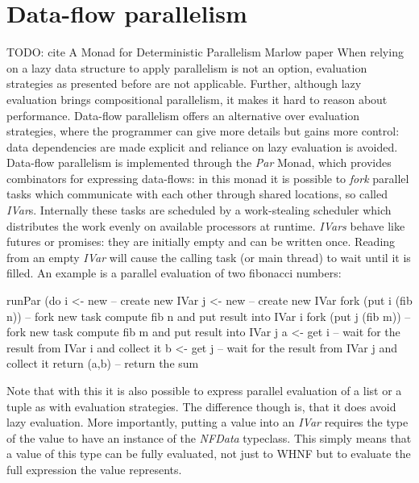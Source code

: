 \section{Data-flow parallelism}
TODO: cite A Monad for Deterministic Parallelism Marlow paper
When relying on a lazy data structure to apply parallelism is not an option, evaluation strategies as presented before are not applicable. Further, although lazy evaluation brings compositional parallelism, it makes it hard to reason about performance. Data-flow parallelism offers an alternative over evaluation strategies, where the programmer can give more details but gains more control: data dependencies are made explicit and reliance on lazy evaluation is avoided.
Data-flow parallelism is implemented through the \textit{Par} Monad, which provides combinators for expressing data-flows: in this monad it is possible to \textit{fork} parallel tasks which communicate with each other through shared locations, so called \textit{IVar}s. Internally these tasks are scheduled by a work-stealing scheduler which distributes the work evenly on available processors at runtime. \textit{IVars} behave like futures or promises: they are initially empty and can be written once. Reading from an empty \textit{IVar} will cause the calling task (or main thread) to wait until it is filled. An example is a parallel evaluation of two fibonacci numbers:

\begin{HaskellCode}
runPar (do
  i <- new             -- create new IVar
  j <- new             -- create new IVar
  fork (put i (fib n)) -- fork new task compute fib n and put result into IVar i
  fork (put j (fib m)) -- fork new task compute fib m and put result into IVar j
  a <- get i           -- wait for the result from IVar i and collect it
  b <- get j           -- wait for the result from IVar j and collect it
  return (a,b)         -- return the sum
\end{HaskellCode}

Note that with this it is also possible to express parallel evaluation of a list or a tuple as with evaluation strategies. The difference though is, that it does avoid lazy evaluation. More importantly, putting a value into an \textit{IVar} requires the type of the value to have an instance of the \textit{NFData} typeclass. This simply means that a value of this type can be fully evaluated, not just to WHNF but to evaluate the full expression the value represents.

